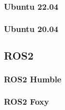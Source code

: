 \subsubsection{Ubuntu 22.04}

\subsubsection{Ubuntu 20.04}


\subsection{ROS2}


\subsubsection{ROS2 Humble}

\subsubsection{ROS2 Foxy}


